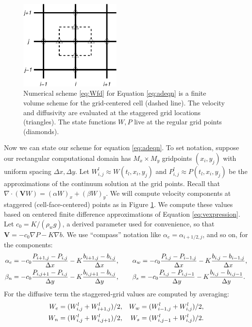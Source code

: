 \documentclass[11pt,final]{amsart}%
\newcommand\bV{\mathbf{V}}
\newcommand{\Div}{\nabla\cdot}
\newcommand{\grad}{\nabla}
\newcommand{\Wlij}{W^l_{i,j}}
\newcommand{\Plij}{P^l_{i,j}}
\begin{document}
\begin{figure}[ht]
\centering
\includegraphics[width=2.0in,keepaspectratio=true]{figs/diffstencil}
\bigskip
\caption{Numerical scheme \eqref{eq:Wfd} for Equation \eqref{eq:adeqn} is a finite volume scheme for the grid-centered cell (dashed line).  The velocity and diffusivity are evaluated at the staggered grid locations (triangles).  The state functions $W,P$ live at the regular grid points (diamonds).}
\label{fig:stencil}
\end{figure}

Now we can state our scheme for equation \eqref{eq:adeqn}.  To set notation, suppose our rectangular computational domain has $M_x \times M_y$ gridpoints $(x_i,y_j)$ with uniform spacing $\Delta x,\Delta y$.  Let $\Wlij \approx W(t_l,x_i,y_j)$ and $\Plij \approx P(t_l,x_i,y_j)$ be the approximations of the continuum solution at the grid points.  Recall that $\Div \left(\bV W\right) = (\alpha W)_x + (\beta W)_y$.  We will compute velocity components at staggered (cell-face-centered) points as in Figure \ref{fig:stencil}.  We compute these values based on centered finite difference approximations of Equation \eqref{eq:vexpression}.  Let $c_0=K/(\rho_w g)$, a derived parameter used for convenience, so that $\bV = - c_0 \grad P - K \grad b$.  We use ``compass'' notation like $\alpha_e = \alpha_{i+1/2,j}$, and so on, for the components:
\begin{align}
\alpha_e &= - c_0 \frac{P_{i+1,j}-P_{i,j}}{\Delta x} - K \frac{b_{i+1,j}-b_{i,j}}{\Delta x}, \qquad \alpha_w = - c_0 \frac{P_{i,j}-P_{i-1,j}}{\Delta x} - K \frac{b_{i,j}-b_{i-1,j}}{\Delta x}, \label{eq:velocitycomp} \\
\beta_n  &= - c_0 \frac{P_{i,j+1}-P_{i,j}}{\Delta y} - K \frac{b_{i,j+1}-b_{i,j}}{\Delta y}, \qquad \beta_s = - c_0 \frac{P_{i,j}-P_{i,j-1}}{\Delta y} - K \frac{b_{i,j}-b_{i,j-1}}{\Delta y}. \notag
\end{align}
For the diffusive term the staggered-grid values are computed by averaging:
\begin{align}
W_e &= (W_{i,j}^l + W_{i+1,j}^l)/2, & W_w &= (W_{i-1,j}^l + W_{i,j}^l)/2, \label{eq:stagW} \\
W_n &= (W_{i,j}^l + W_{i,j+1}^l)/2, & W_s &= (W_{i,j-1}^l + W_{i,j}^l)/2. \notag
\end{align}
\end{document}
